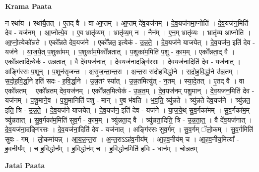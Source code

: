 \documentclass[17pt]{extarticle}
\begin{document}
\textbf{Krama Paata} \newline

न रथा॑य । रथा॑यै॒तत् । ए॒तद् वै । वा आ॒प्तम् । आ॒प्तम् दे॑व॒यज॑नम् । दे॒व॒यज॑नमा॒प्नोति॑ । दे॒व॒यज॑न॒मिति॑ देव - यज॑नम् । आ॒प्नोत्ये॒व । ए॒व भ्रातृ॑व्यम् । भ्रातृ॑व्य॒म् न । नैन᳚म् । ए॒न॒म् भ्रातृ॑व्यः । भ्रातृ॑व्य आप्नोति । आ॒प्नो॒त्येको᳚न्नते । एको᳚न्नते देव॒यज॑ने । एको᳚न्नत॒ इत्येक॑ - उ॒न्न॒ते॒ । दे॒व॒यज॑ने याजयेत् । दे॒व॒यज॑न॒ इति॑ देव - यज॑ने । या॒ज॒ये॒त् प॒शुका॑मम् । प॒शुका॑म॒मेको᳚न्नतात् । प॒शुका॑म॒मिति॑ प॒शु - का॒म॒म् । एको᳚न्नता॒द् वै । एको᳚न्नता॒दित्येक॑ - उ॒न्न॒ता॒त्॒ । वै दे॑व॒यज॑नात् । दे॒व॒यज॑ना॒दङ्‍गि॑रसः । दे॒व॒यज॑ना॒दिति॑ देव - यज॑नात् । अङ्‍गि॑रसः प॒शून् । प॒शून॑सृजन्त । अ॒सृ॒ज॒न्ता॒न्त॒रा । अ॒न्त॒रा स॑दोहविर्द्धा॒ने । स॒दो॒ह॒वि॒र्द्धा॒ने उ॑न्न॒तम् । स॒दो॒ह॒वि॒र्द्धा॒ने इति॑ सदः - ह॒वि॒र्द्धा॒ने । उ॒न्न॒तꣳ स्या᳚त् । उ॒न्न॒तमित्यु॑त् - न॒तम् । स्या॒दे॒तत् । ए॒तद् वै । वा एको᳚न्नतम् । एको᳚न्नतम् देव॒यज॑नम् । एको᳚न्नत॒मित्येक॑ - उ॒न्न॒त॒म् । दे॒व॒यज॑नम् पशु॒मान् । दे॒व॒यज॑न॒मिति॑ देव - यज॑नम् । प॒शु॒माने॒व । प॒शु॒मानिति॑ पशु - मान् । ए॒व भ॑वति । भ॒व॒ति॒ त्र्यु॑न्नते । त्र्यु॑न्नते देव॒यज॑ने । त्र्यु॑न्नत॒ इति॒ त्रि - उ॒न्न॒ते॒ । दे॒व॒यज॑ने याजयेत् । दे॒व॒यज॑न॒ इति॑ देव - यज॑ने । या॒ज॒ये॒थ् सु॒व॒र्गका॑मम् । सु॒व॒र्गका॑म॒म् त्र्यु॑न्नतात् । सु॒व॒र्गका॑म॒मिति॑ सुव॒र्ग - का॒म॒म् । त्र्यु॑न्नता॒द् वै । त्र्यु॑न्नता॒दिति॒ त्रि - उ॒न्न॒ता॒त्॒ । वै दे॑व॒यज॑नात् । दे॒व॒यज॑ना॒दङ्‍गि॑रसः । दे॒व॒यज॑ना॒दिति॑ देव - यज॑नात् । अङ्‍गि॑रसः सुव॒र्गम् । सु॒व॒र्गम् ॅलो॒कम् । सु॒व॒र्गमिति॑ सुवः - गम् । लो॒कमा॑यन्न् । आ॒य॒न्न॒न्त॒रा । अ॒न्त॒राऽऽह॑व॒नीय᳚म् । आ॒ह॒व॒नीय॑म् च । आ॒ह॒व॒नीय॒मित्या᳚ - ह॒व॒नीय᳚म् । च॒ ह॒वि॒र्द्धान᳚म् । ह॒वि॒र्द्धान॑म् च । ह॒वि॒र्द्धान॒मिति॑ हविः - धान᳚म् । चो॒न्न॒तम् \newline

\textbf{Jatai Paata} \newline
\end{document}
